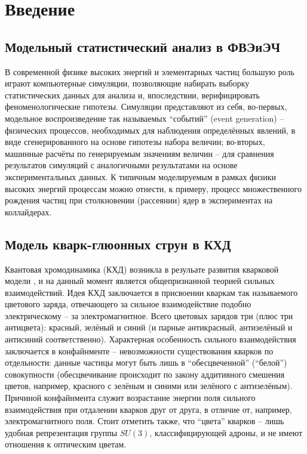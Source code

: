 \section{Введение}
\subsection{Модельный статистический анализ в ФВЭиЭЧ}
В современной физике высоких энергий и элементарных частиц большую роль играют компьютерные симуляции, позволяющие набирать выборку статистических данных для анализа и, впоследствии, верифицировать феноменологические гипотезы. 
Симуляции представляют из себя, во-первых, модельное воспроизведение так называемых ``событий'' (event generation) -- физических процессов, необходимых для наблюдения определённых явлений, в виде сгенерированного на основе гипотезы набора величин; во-вторых, машинные расчёты по генерируемым значениям величин -- для сравнения результатов симуляций с аналогичными результатами на основе экспериментальных данных. 
К типичным моделируемым в рамках физики высоких энергий процессам можно отнести, к примеру, процесс множественного рождения частиц при столкновении (рассеянии) ядер в экспериментах на коллайдерах.
\subsection{Модель кварк-глюонных струн в КХД}
Квантовая хромодинамика (КХД) возникла в резульате развития кварковой модели \cite{YndurainQCD}, и на данный момент является общепризнанной теорией сильных взаимодействий. 
Идея КХД заключается в присвоении кваркам так называемого цветового заряда, отвечающего за сильное взаимодействие подобно электрическому -- за электромагнитное. 
Всего цветовых зарядов три (плюс три антицвета): красный, зелёный и синий (и парные антикрасный, антизелёный и антисиний соответственно). 
Характерная особенность сильного взаимодействия заключается в конфайнменте -- невозможности существования кварков по отдельности: данные частицы могут быть лишь в ``обесцвеченной'' (``белой'') совокупности (обесцвечивание происходит по закону аддитивного смешения цветов, например, красного с зелёным и синими или зелёного с антизелёным). 
Причиной конфайнмента служит возрастание энергии поля сильного взаимодействия при отдалении кварков друг от друга, в отличие от, например, электромагнитного поля. 
Стоит отметить также, что ``цвета'' кварков -- лишь удобная репрезентация группы $SU(3)$, классифицирующей адроны, и не имеют отношения к оптическим цветам.

